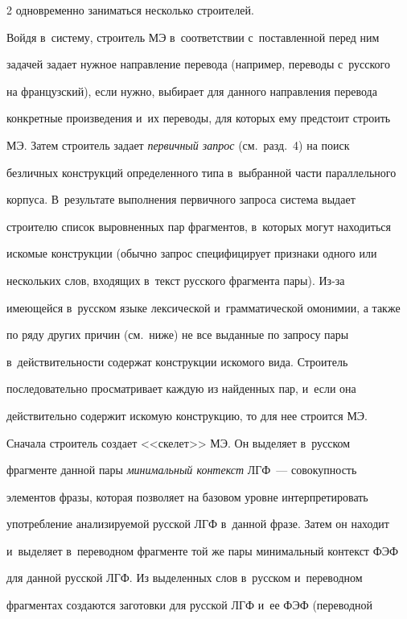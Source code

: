 \begin{multicols}{2}
одновременно заниматься несколько строителей. 

  

  Войдя в~систему, строитель МЭ в~соответствии с~поставленной перед ним 

задачей задает нужное направление перевода (например, переводы с~русского 

на французский), если нужно, выбирает для данного направления перевода 

конкретные произведения и~их переводы, для которых ему предстоит строить 

МЭ. Затем строитель задает \textit{первичный запрос} (см.\ разд.~4) на поиск 

безличных конструкций определенного типа в~выбранной части параллельного 

корпуса. В~результате выполнения первичного запроса система выдает 

строителю список выровненных пар фрагментов, в~которых могут находиться 

искомые конструкции (обычно запрос специфицирует признаки одного или 

нескольких слов, входящих в~текст русского фрагмента пары). Из-за 

имеющейся в~русском языке лексической и~грамматической омонимии, а также 

по ряду других причин (см.\ ниже) не все выданные по запросу пары 

в~действительности содержат конструкции искомого вида. Строитель 

последовательно просматривает каждую из найденных пар, и~если она 

действительно содержит искомую конструкцию, то для нее строится МЭ. 

  

  Сначала строитель создает <<скелет>> МЭ. Он выделяет в~русском 

фрагменте данной пары \textit{минимальный контекст} ЛГФ~---  совокупность 

элементов фразы, которая позволяет на базовом уровне интерпретировать 

употребление анализируемой русской ЛГФ в~данной фразе. Затем он находит 

и~выделяет в~переводном фрагменте той же пары минимальный контекст ФЭФ 

для данной русской ЛГФ. Из выделенных слов в~русском и~переводном 

фрагментах создаются заготовки для русской ЛГФ и~ее ФЭФ (переводной 


\end{multicols}
